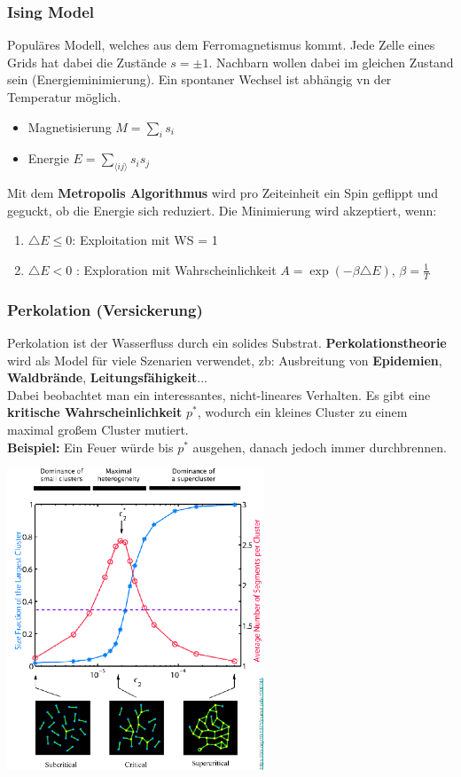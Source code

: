 \documentclass[a4paper]{article}
\begin{document}
\subsubsection{Ising Model}
Populäres Modell, welches aus dem Ferromagnetismus kommt. Jede Zelle eines Grids hat dabei die Zustände $s=\pm1$. Nachbarn wollen dabei im gleichen Zustand sein (Energieminimierung). Ein spontaner Wechsel ist abhängig vn der Temperatur möglich.
\begin{itemize}
	\item Magnetisierung $M=\sum_{i}s_i$
	\item Energie $E = \sum_{\langle ij \rangle}s_is_j$
\end{itemize}
Mit dem \textbf{Metropolis Algorithmus} wird pro Zeiteinheit ein Spin geflippt und geguckt, ob die Energie sich reduziert. Die Minimierung wird akzeptiert, wenn:
\begin{enumerate}
	\item $\triangle E \leq 0$: Exploitation mit WS = 1
	\item $\triangle E < 0$ : Exploration mit Wahrscheinlichkeit $A = \exp(-\beta\triangle E)$, $\beta = \frac{1}{T}$
\end{enumerate}
\subsubsection{Perkolation (Versickerung)}
Perkolation ist der Wasserfluss durch ein solides Substrat. \textbf{Perkolationstheorie} wird als Model für viele Szenarien verwendet, zb: Ausbreitung von \textbf{Epidemien}, \textbf{Waldbrände}, \textbf{Leitungsfähigkeit}...\\
Dabei beobachtet man ein interessantes, nicht-lineares Verhalten. Es gibt eine \textbf{kritische Wahrscheinlichkeit} $p^*$, wodurch ein kleines Cluster zu einem maximal großem Cluster mutiert.\\ \textbf{Beispiel:} Ein Feuer würde bis $p^*$ ausgehen, danach jedoch immer durchbrennen.\\

\begin{center}
	\includegraphics[height = 9cm]{Percolation.png}
\end{center}
\end{document}
